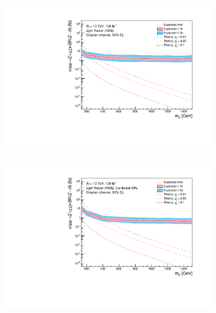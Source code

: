 \documentclass[12pt, a4paper]{book}
\begin{document}
\begin{figure}[!ht]
\begin{subfigure}[b]{0.49\textwidth}
   \end{subfigure}
   \hfill
   \begin{subfigure}[b]{0.49\textwidth}
      \centering
      \includegraphics[width=1\textwidth]{Limits/LV_HDS/mass_exclusion_comb.pdf}
   \end{subfigure}
   \hfill
   \begin{subfigure}[b]{0.49\textwidth}
      \centering
      \includegraphics[width=1\textwidth]{Limits/Model_independent/LV_HDS/mass_exclusion_comb.pdf}
   \end{subfigure}
   \hfill
	\begin{subfigure}[b]{0.49\textwidth}
      \centering

\end{subfigure}
\end{figure}
\end{document}
